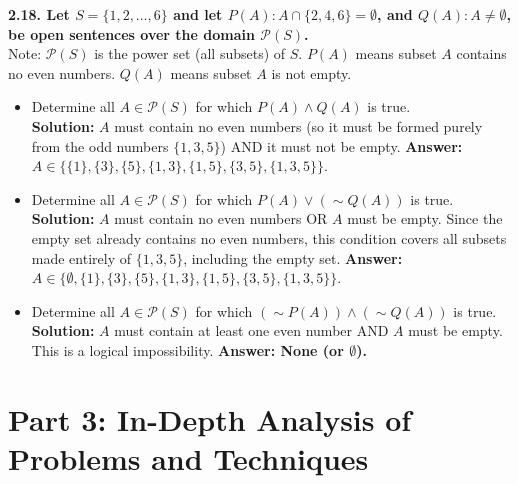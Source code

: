 \documentclass[11pt]{article}
\begin{document}
\vspace{0.5cm}
\textbf{2.18. Let $S = \{1, 2, \dots, 6\}$ and let $P(A): A \cap \{2, 4, 6\} = \emptyset$, and $Q(A): A \neq \emptyset$, be open sentences over the domain $\mathcal{P}(S)$.} \\
Note: $\mathcal{P}(S)$ is the power set (all subsets) of $S$. $P(A)$ means subset $A$ contains no even numbers. $Q(A)$ means subset $A$ is not empty.
\begin{itemize}
    \item[(a)] Determine all $A \in \mathcal{P}(S)$ for which $P(A) \land Q(A)$ is true. \\
    \textbf{Solution:} $A$ must contain no even numbers (so it must be formed purely from the odd numbers $\{1, 3, 5\}$) AND it must not be empty. 
    \textbf{Answer:} $A \in \{\{1\}, \{3\}, \{5\}, \{1, 3\}, \{1, 5\}, \{3, 5\}, \{1, 3, 5\}\}$.
    
    \item[(b)] Determine all $A \in \mathcal{P}(S)$ for which $P(A) \lor (\sim Q(A))$ is true. \\
    \textbf{Solution:} $A$ must contain no even numbers OR $A$ must be empty. Since the empty set already contains no even numbers, this condition covers all subsets made entirely of $\{1, 3, 5\}$, including the empty set.
    \textbf{Answer:} $A \in \{\emptyset, \{1\}, \{3\}, \{5\}, \{1, 3\}, \{1, 5\}, \{3, 5\}, \{1, 3, 5\}\}$.
    
    \item[(c)] Determine all $A \in \mathcal{P}(S)$ for which $(\sim P(A)) \land (\sim Q(A))$ is true. \\
    \textbf{Solution:} $A$ must contain at least one even number AND $A$ must be empty. This is a logical impossibility. 
    \textbf{Answer: None (or $\emptyset$).}
\end{itemize}

\newpage
\section{Part 3: In-Depth Analysis of Problems and Techniques}
\end{document}
